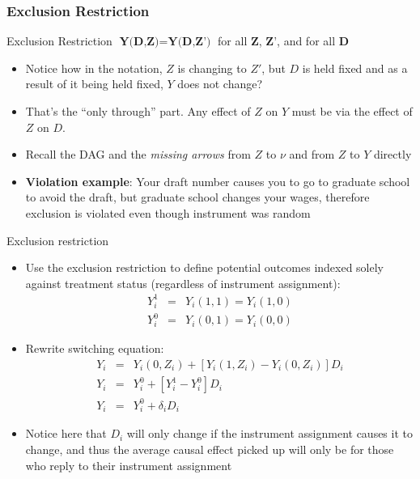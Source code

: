 \documentclass{beamer}
\begin{document}
\begin{frame}[plain]
\frametitle{Exclusion Restriction}

	\begin{block}{Exclusion Restriction}
	$\textbf{Y(D,Z)}=\textbf{Y(D,Z')}$ for all $\textbf{Z}$, $\textbf{Z'}$, and for all $\textbf{D}$
	\end{block}
	
\begin{itemize}
\item Notice how in the notation, $Z$ is changing to $Z'$, but $D$ is held fixed and as a result of it being held fixed, $Y$ does not change?
\item  That's the ``only through'' part. Any effect of $Z$ on $Y$ must be via the effect of $Z$ on $D$.
\item Recall the DAG and the \emph{missing arrows} from $Z$ to $\nu$ and from $Z$ to $Y$ directly
\item \textbf{Violation example}:  Your draft number causes you to go to graduate school to avoid the draft, but graduate school changes your wages, therefore exclusion is violated even though instrument was random
\end{itemize}
	
\end{frame}





\begin{frame}{Exclusion restriction}
	
	\begin{itemize}
	\item Use the exclusion restriction to define potential outcomes indexed solely against treatment status (regardless of instrument assignment): 
		\begin{eqnarray*}
		 Y^1_{i} &=& Y_i(1,1) = Y_i(1,0) \\
		 Y^0_{i} &=& Y_i(0,1) = Y_i(0,0)
		\end{eqnarray*}
	\item Rewrite switching equation:
		\begin{eqnarray*}
		Y_i &=& Y_i(0,Z_i) + [Y_i(1,Z_i) - Y_i(0,Z_i)]D_i \\
		Y_i &=& Y^0_{i} + [Y^1_{i} - Y^0_{i}]D_i \\
		Y_i &=& Y^0_i + \delta_iD_i
		\end{eqnarray*}
	\item Notice here that $D_i$ will only change if the instrument assignment causes it to change, and thus the average causal effect picked up will only be for those who reply to their instrument assignment
	\end{itemize}

\end{frame}
\end{document}
